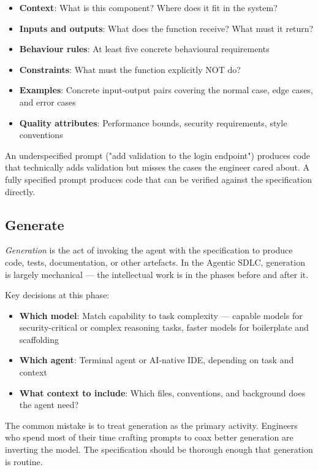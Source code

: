 \documentclass[11pt,a4paper]{book}
\begin{document}
\begin{itemize}
  \item \textbf{Context}: What is this component? Where does it fit in the system?
  \item \textbf{Inputs and outputs}: What does the function receive? What must it return?
  \item \textbf{Behaviour rules}: At least five concrete behavioural requirements
  \item \textbf{Constraints}: What must the function explicitly NOT do?
  \item \textbf{Examples}: Concrete input-output pairs covering the normal case, edge cases, and error cases
  \item \textbf{Quality attributes}: Performance bounds, security requirements, style conventions
\end{itemize}

An underspecified prompt ("add validation to the login endpoint") produces code that technically adds validation but misses the cases the engineer cared about. A fully specified prompt produces code that can be verified against the specification directly.

\subsection{Generate}

\textit{Generation} is the act of invoking the agent with the specification to produce code, tests, documentation, or other artefacts. In the Agentic SDLC, generation is largely mechanical --- the intellectual work is in the phases before and after it.

Key decisions at this phase:
\begin{itemize}
  \item \textbf{Which model}: Match capability to task complexity --- capable models for security-critical or complex reasoning tasks, faster models for boilerplate and scaffolding
  \item \textbf{Which agent}: Terminal agent or AI-native IDE, depending on task and context
  \item \textbf{What context to include}: Which files, conventions, and background does the agent need?
\end{itemize}

The common mistake is to treat generation as the primary activity. Engineers who spend most of their time crafting prompts to coax better generation are inverting the model. The specification should be thorough enough that generation is routine.
\end{document}
